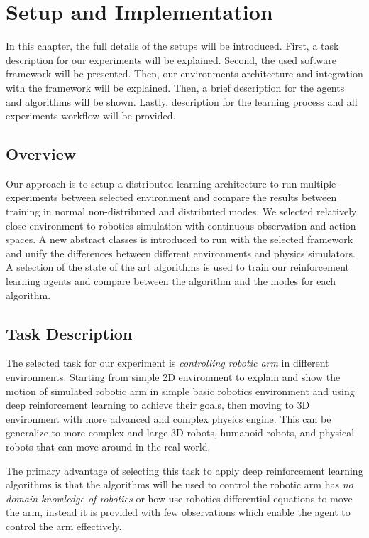
\chapter{Setup and Implementation}\label{chapter:setup_and_implementation}

In this chapter, the full details of the setups will be introduced. First, a task description for our experiments will be explained. Second, the used software framework will be presented. Then, our environments architecture and integration with the framework will be explained. Then, a brief description for the agents and algorithms will be shown. Lastly, description for the learning process and all experiments workflow will be provided.

\section{Overview}

Our approach is to setup a distributed learning architecture to run multiple experiments between selected environment and compare the results between training in normal non-distributed and distributed modes. We selected relatively close environment to robotics simulation with continuous observation and action spaces. A new abstract classes is introduced to run with the selected framework and unify the differences between different environments and physics simulators. A selection of the state of the art algorithms is used to train our reinforcement learning agents and compare between the algorithm and the modes for each algorithm.

\section{Task Description}

The selected task for our experiment is \textit{controlling robotic arm} in different environments. Starting from simple 2D environment to explain and show the motion of simulated robotic arm in simple basic robotics environment and using deep reinforcement learning to achieve their goals, then moving to 3D environment with more advanced and complex physics engine. This can be generalize to more complex and large 3D robots, humanoid robots, and physical robots that can move around in the real world.

The primary advantage of selecting this task to apply deep reinforcement learning algorithms is that the algorithms will be used to control the robotic arm has \textit{no domain knowledge of robotics} or how use robotics differential equations to move the arm, instead it is provided with few observations which enable the agent to control the arm effectively. 

